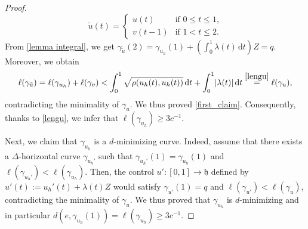 \documentclass[a4paper,11pt,reqno]{amsart}
\theoremstyle{plain}
\theoremstyle{definition}
\newcommand{\de}{\mathrm{d}}
\begin{document}
\begin{proof}
\begin{equation*}
 \widetilde{u}(t) = \begin{cases}
 u(t) & \text{if $0\le t \le 1$,} \\ v(t-1) & \text{if $1<t\le2$.}
 \end{cases}
 \end{equation*}
 From \cref{lemma integral}, we get $\gamma_{\tilde{u}}(2) = \gamma_{u_h}(1) + \left(\int^1_0 \lambda(t) \, \de t \right) Z =q$. Moreover, we obtain
 $$\ell(\gamma_{\tilde{u}}) = \ell(\gamma_{u_h}) + \ell(\gamma_v) < \int^1_0 \sqrt{\rho(u_h(t),u_h(t))} \, \de t + \int^1_0 \lvert \lambda(t) \rvert \, \de t \stackrel{\eqref{lengu}}{=} \ell(\gamma_u),$$
 contradicting the minimality of $\gamma_u$. We thus proved \eqref{first_claim}. Consequently, thanks to \eqref{lengu}, we infer that $\ell(\gamma_{u_h}) \ge 3c^{-1}$.

 Next, we claim that $\gamma_{u_h}$ is a $d$-minimizing curve. Indeed, assume that there exists a $\Delta$-horizontal curve $\gamma_{u_h'}$ such that $\gamma_{u_h'}(1) = \gamma_{u_h}(1)$ and $\ell(\gamma_{u_h'}) < \ell(\gamma_{u_h})$. Then, the control $u' \colon [0,1] \to \mathfrak{h}$ defined by $u'(t) := u_h'(t) + \lambda(t)Z$ would satisfy $\gamma_{u'}(1)=q$ and $\ell(\gamma_{u'})<\ell(\gamma_u)$, contradicting the minimality of $\gamma_u$. We thus proved that $\gamma_{u_h}$ is $d$-minimizing and in particular $d(e,\gamma_{u_h}(1))= \ell(\gamma_{u_h}) \ge 3c^{-1}$.


\end{proof}
\end{document}
